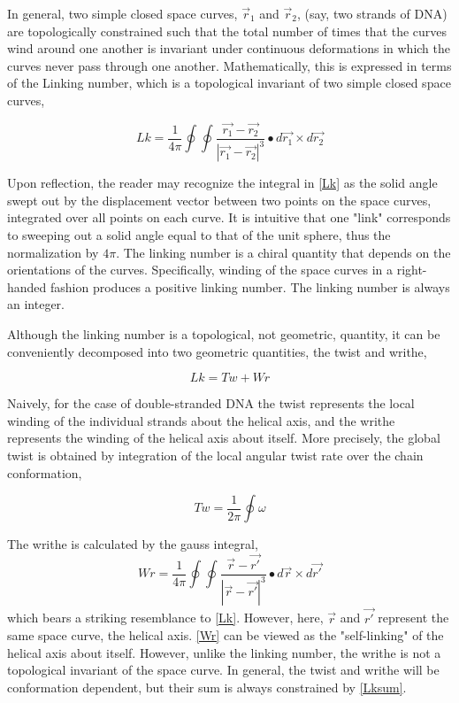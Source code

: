 \documentclass[english]{article}
\begin{document}
In general, two simple closed space curves, $\vec{r}_1$ and $\vec{r}_2$, (say, two strands of DNA) are topologically constrained such that the total number of times that the curves wind around one another is invariant under continuous deformations in which the curves never pass through one another. Mathematically, this is expressed in terms of the Linking number, which is a topological invariant of two simple closed space curves,

\begin{equation}
Lk=\frac{1}{4\pi}\oint\oint\frac{\vec{r_1}-\vec{r_2}}{|\vec{r_1}-\vec{r_2}|^3}\bullet d \vec{r_1}\times d \vec{r_2}
\label{Lk}
\end{equation}

Upon reflection, the reader may recognize the integral in \eqref{Lk} as the solid angle swept out by the displacement vector between two points on the space curves, integrated over all points on each curve. It is intuitive that one "link" corresponds to sweeping out a solid angle equal to that of the unit sphere, thus the normalization by $4\pi$. The linking number is a chiral quantity that depends on the orientations of the curves. Specifically, winding of the space curves in a right-handed fashion produces a positive linking number. The linking number is always an integer.

Although the linking number is a topological, not geometric, quantity, it can be conveniently decomposed into two geometric quantities, the twist and writhe,

\begin{equation}
Lk=Tw+Wr
\label{Lksum}
\end{equation}

Naively, for the case of double-stranded DNA the twist represents the local winding of the individual strands about the helical axis, and the writhe represents the winding of the helical axis about itself. More precisely, the global twist is obtained by integration of the local angular twist rate over the chain conformation,

\begin{equation} 
Tw=\frac{1}{2\pi}\oint\omega
\end{equation}

The writhe is calculated by the gauss integral,
\begin{equation}
Wr=\frac{1}{4\pi}\oint\oint\frac{\vec{r}-\vec{r'}}{|\vec{r}-\vec{r'}|^3}\bullet d \vec{r}\times d \vec{r'}
\label{Wr}
\end{equation}
which bears a striking resemblance to \eqref{Lk}. However, here, $\vec{r}$ and $\vec{r'}$ represent the same space curve, the helical axis. \eqref{Wr} can be viewed as the "self-linking" of the helical axis about itself. However, unlike the linking number, the writhe is not a topological invariant of the space curve. In general, the twist and writhe will be conformation dependent, but their sum is always constrained by \eqref{Lksum}.
\end{document}
